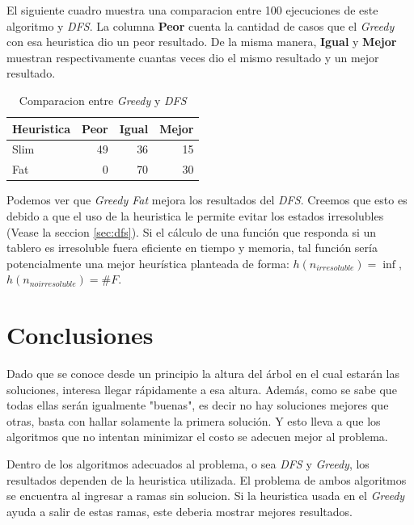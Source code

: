 \documentclass[a4paper,10pt]{article}
\begin{document}
    El siguiente cuadro muestra una comparacion entre 100 ejecuciones de este algoritmo y \textit{DFS}.
    La columna \textbf{Peor} cuenta la cantidad de casos que el \textit{Greedy} con esa heuristica dio un peor resultado.
    De la misma manera, \textbf{Igual} y \textbf{Mejor} muestran respectivamente cuantas veces dio el mismo resultado y un mejor resultado.

    \begin{table}[H]
        \label{greedy-dfs}

        \begin{center}
        \begin{tabular}{l|r|r|r}
            Heuristica & Peor & Igual & Mejor \\
            \hline
            Slim & 49 & 36 & 15 \\
            Fat & 0 & 70 & 30 \\
        \end{tabular}
        \end{center}
        \caption{Comparacion entre \textit{Greedy} y \textit{DFS}}

    \end{table}

    Podemos ver que \textit{Greedy Fat} mejora los resultados del \textit{DFS}.
    Creemos que esto es debido a que el uso de la heuristica le permite evitar los estados irresolubles (Vease la seccion \ref{sec:dfs}).
    Si el cálculo de una función que responda si un tablero es irresoluble fuera eficiente en tiempo y memoria, tal función sería potencialmente una mejor heurística planteada de forma: $h(n_{irresoluble}) = \inf$, $h(n_{no irresoluble}) = \#F$.

\section{Conclusiones}
    Dado que se conoce desde un principio la altura del árbol en el cual estarán las soluciones, interesa llegar rápidamente a esa altura.
    Además, como se sabe que todas ellas serán igualmente "buenas", es decir no hay soluciones mejores que otras, basta con hallar solamente la primera solución.
    Y esto lleva a que los algoritmos que no intentan minimizar el costo se adecuen mejor al problema.

    Dentro de los algoritmos adecuados al problema, o sea \textit{DFS} y \textit{Greedy}, los resultados dependen de la heuristica utilizada.
    El problema de ambos algoritmos se encuentra al ingresar a ramas sin solucion.
    Si la heuristica usada en el \textit{Greedy} ayuda a salir de estas ramas, este deberia mostrar mejores resultados.


\end{document}
